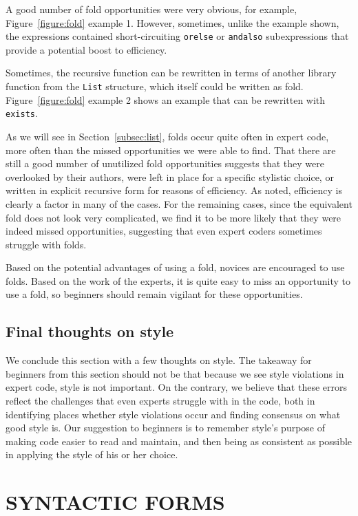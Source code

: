 \documentclass[12pt,abstracton]{scrartcl}
\begin{document}
A good number of fold opportunities were very obvious, for example,
Figure~\ref{figure:fold} example 1. However, sometimes,
unlike the example shown, the expressions contained short-circuiting
\texttt{orelse} or \texttt{andalso} subexpressions that provide
a potential boost to efficiency.

Sometimes, the recursive function can be rewritten in terms of another library function
from the \texttt{List} structure, which itself could be written as fold.
Figure~\ref{figure:fold} example 2 shows an example that can be rewritten with \texttt{exists}.

As we will see in Section~\ref{subsec:list}, folds occur quite often in
expert code, more often than the missed opportunities we were able to find.
That there are still a good number of unutilized fold opportunities
suggests that they were overlooked by their authors,
were left in place for a specific stylistic choice, or
written in explicit recursive form for reasons of efficiency.
As noted, efficiency is clearly a factor in many of the cases.
For the remaining cases, since the equivalent fold does not
look very complicated, we find it to be more likely that they were
indeed missed opportunities, suggesting that even expert
coders sometimes struggle with folds.

Based on the potential advantages of using a fold, novices
are encouraged to use folds. Based on the work of the experts,
it is quite easy to miss an opportunity to use a fold, so
beginners should remain vigilant for these opportunities.
\subsection{Final thoughts on style}\label{subsec:stylethoughts}
We conclude this section with a few thoughts on style.
The takeaway for beginners from this section should not be
that because we see style violations in expert code,
style is not important. On the contrary, we believe that
these errors reflect the challenges that even experts
struggle with in the code, both in identifying places
whether style violations occur and finding consensus on
what good style is. Our suggestion to beginners is to
remember style's purpose of making code easier to read
and maintain, and then being as consistent as possible
in applying the style of his or her choice.
\section{SYNTACTIC FORMS}\label{sec:syntax}
\end{document}
